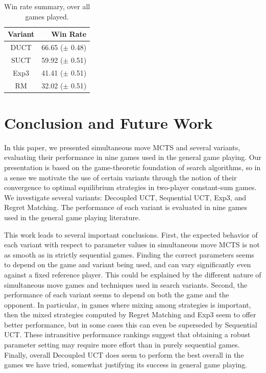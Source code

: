 \documentclass[conference]{IEEEtran}
\begin{document}
\begin{table}
\begin{center}
\begin{tabular}{|c|r|}
\hline
Variant     & Win Rate \\
\hline
      DUCT  &   66.65 ($\pm$ 0.48) \\
      SUCT  &   59.92 ($\pm$ 0.51) \\
      Exp3  &   41.41 ($\pm$ 0.51) \\
        RM  &   32.02 ($\pm$ 0.51) \\
\hline
\end{tabular}
\end{center}
\caption{Win rate summary, over all games played. \label{tbl:summary}}
\end{table}


\section{Conclusion and Future Work}
\label{sec:conc}

In this paper, we presented simultaneous move MCTS and several variants, evaluating their performance in nine games used in the general game playing. 
Our presentation is based on the game-theoretic foundation of search algorithms, so in a sense we motivate the use of certain variants through 
the notion of their convergence to optimal equilibrium strategies in two-player constant-sum games. 
We investigate several variants: Decoupled UCT, Sequential UCT, Exp3, and Regret Matching. The performance of each variant is evaluated in nine 
games used in the general game playing literature.

This work leads to several important conclusions. First, the expected behavior of each variant with respect to parameter values in simultaneous move MCTS
is not as smooth as in strictly sequential games. Finding the correct parameters seems to depend on the game and variant being used, and can vary 
significantly even against a fixed reference player. This could be explained by the different nature of simultaneous move games and techniques used 
in search variants. Second, the performance of each variant seems to depend on both the game and the opponent. In particular, in games where mixing 
among strategies is important, then the mixed strategies computed by Regret Matching and Exp3 seem to offer better performance, but in some cases this 
can even be superseded by Sequential UCT. These intransitive performance rankings suggest that obtaining a robust parameter setting may require more 
effort than in purely sequential games. Finally, overall Decoupled UCT does seem to perform the best overall in the games we have tried, somewhat 
justifying its success in general game playing. 
\end{document}
